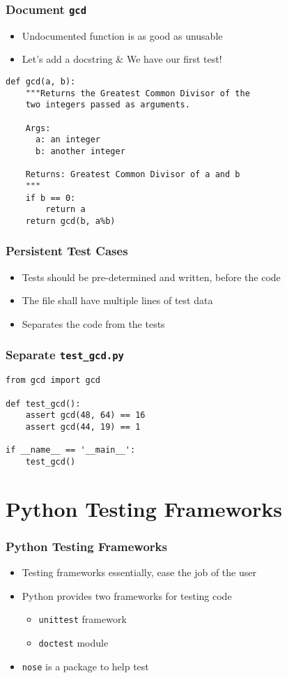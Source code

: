\documentclass[12pt,presentation]{beamer}
\begin{document}
\begin{frame}[fragile]
  \frametitle{Document \texttt{gcd}}
  \begin{itemize}
  \item Undocumented function is as good as unusable
  \item Let's add a docstring \& We have our first test!
  \end{itemize}
\begin{lstlisting}
def gcd(a, b):
    """Returns the Greatest Common Divisor of the
    two integers passed as arguments.

    Args:
      a: an integer
      b: another integer

    Returns: Greatest Common Divisor of a and b
    """
    if b == 0:
        return a
    return gcd(b, a%b)
\end{lstlisting}
\end{frame}


\begin{frame}[fragile]
  \frametitle{Persistent Test Cases}
  \begin{itemize}
  \item Tests should be pre-determined and written, before the code
  \item The file shall have multiple lines of test data
  \item Separates the code from the tests
  \end{itemize}
\end{frame}

\begin{frame}[fragile]
    \frametitle{Separate \texttt{test\_gcd.py}}
\begin{lstlisting}
from gcd import gcd

def test_gcd():
    assert gcd(48, 64) == 16
    assert gcd(44, 19) == 1

if __name__ == '__main__':
    test_gcd()
\end{lstlisting}
\end{frame}

\section{Python Testing Frameworks}

\begin{frame}[fragile]
  \frametitle{Python Testing Frameworks}
  \begin{itemize}
  \item Testing frameworks essentially, ease the job of the user
  \item Python provides two frameworks for testing code
    \begin{itemize}
    \item \texttt{unittest} framework
    \item \texttt{doctest} module
    \end{itemize}
\item \texttt{nose} is a package to help test
  \end{itemize}
\end{frame}
\end{document}
